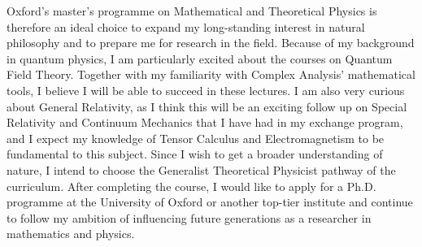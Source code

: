 \documentclass[10pt]{article}
\begin{document}
Oxford's master's programme on Mathematical and Theoretical Physics is therefore an ideal choice to expand my long-standing interest in natural philosophy and to prepare me for research in the field. Because of my background in quantum physics, I am particularly excited about the courses on Quantum Field Theory. Together with my familiarity with Complex Analysis' mathematical tools, I believe I will be able to succeed in these lectures. I am also very curious about General Relativity, as I think this will be an exciting follow up on Special Relativity and Continuum Mechanics that I have had in my exchange program, and I expect my knowledge of Tensor Calculus and Electromagnetism to be fundamental to this subject. Since I wish to get a broader understanding of nature, I intend to choose the Generalist Theoretical Physicist pathway of the curriculum. After completing the course, I would like to apply for a Ph.D. programme at the University of Oxford or another top-tier institute and continue to follow my ambition of influencing future generations as a researcher in mathematics and physics.
\end{document}
